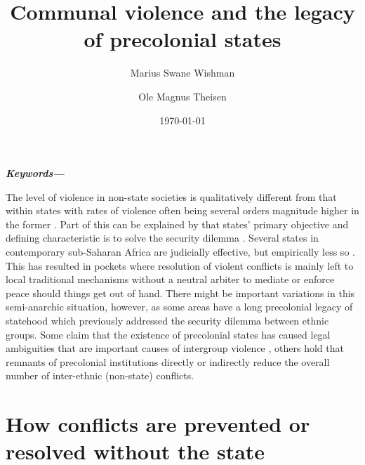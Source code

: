\documentclass[12pt]{article}
\title{Communal violence and the legacy of precolonial states}
\author[$\dagger$]{Marius Swane Wishman}
\author[$\ddagger$]{Ole Magnus Theisen}
\affil[$\dagger,\ddagger$]{Department of Sociology and Political Science, NTNU}
\date{\today}
\providecommand{\keywords}[1]
{
	\small	
	\textbf{\textit{Keywords---}} #1
}
\begin{document}
\maketitle

\begin{abstract}
\end{abstract}

\keywords{}

\pagebreak

\onehalfspacing

The level of violence in non-state societies is qualitatively different from
that within states with rates of violence often being several orders magnitude
higher in the former \citep{diamond2013world, LeBlanc2003, Pinker2012}. Part of
this can be explained by that states’ primary objective and defining
characteristic is to solve the security dilemma \citep{Hobbes, Lake_1996}.
Several states in contemporary sub-Saharan Africa are judicially effective, but
empirically less so \citep{Jackson_1982}. This has resulted in pockets where
resolution of violent conflicts is mainly left to local traditional mechanisms
without a neutral arbiter to mediate or enforce peace should things get out of
hand. There might be important variations in this semi-anarchic situation,
however, as some areas have a long precolonial legacy of statehood which
previously addressed the security dilemma between ethnic groups. Some claim that
the existence of precolonial states has caused legal ambiguities that are
important causes of intergroup violence \citep{Eck2014}, others hold that
remnants of precolonial institutions directly \citep{Herbst2014, Wig2018} or
indirectly reduce the overall number of inter-ethnic (non-state) conflicts. 

\section{How conflicts are prevented or resolved without the state}
\end{document}
